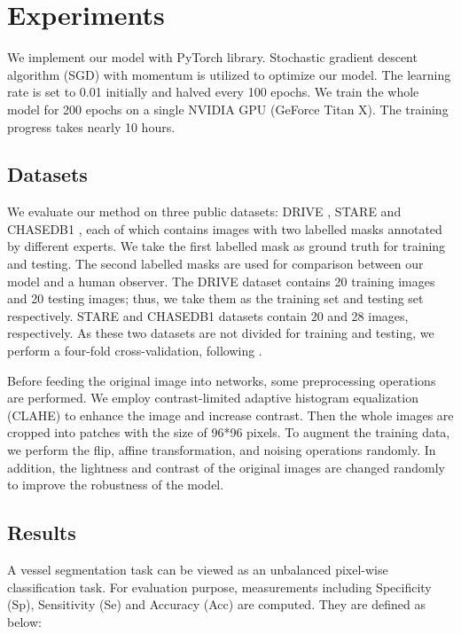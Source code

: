 \documentclass[runningheads,a4paper]{llncs}
\begin{document}
\section{Experiments}

We implement our model with PyTorch library. Stochastic gradient descent algorithm (SGD) with momentum is utilized to optimize our model. The learning rate is set to 0.01 initially and halved every 100 epochs. We train the whole model for 200 epochs on a single NVIDIA GPU (GeForce Titan X). The training progress takes nearly 10 hours.

\subsection{Datasets}

We evaluate our method on three public datasets: DRIVE \cite{staal2004ridge}, STARE \cite{hoover2000locating} and CHASEDB1 \cite{fraz2012ensemble}, each of which contains images with two labelled masks annotated by different experts. We take the first labelled mask as ground truth for training and testing. The second labelled masks are used for comparison between our model and a human observer. The DRIVE dataset contains 20 training images and 20 testing images; thus, we take them as the training set and testing set respectively. STARE and CHASEDB1 datasets contain 20 and 28 images, respectively. As these two datasets are not divided for training and testing, we perform a four-fold cross-validation, following \cite{mo2017multi}.

Before feeding the original image into networks, some preprocessing operations are performed. We employ contrast-limited adaptive histogram equalization (CLAHE) to enhance the image and increase contrast. Then the whole images are cropped into patches with the size of 96*96 pixels. To augment the training data, we perform the flip, affine transformation, and noising operations randomly. In addition, the lightness and contrast of the original images are changed randomly to improve the robustness of the model.

\subsection{Results}

A vessel segmentation task can be viewed as an unbalanced pixel-wise classification task. For evaluation purpose, measurements including Specificity (Sp), Sensitivity (Se) and Accuracy (Acc) are computed. They are defined as below:
\end{document}
